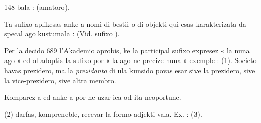 \begin{VUpage}[152]{148}
\VUcontinue
bala :  (amatoro), \nl
{}\nl
{}\nl
{}\nl
{}

Ta sufixo aplikesas anke a nomi di bestii o di objekti qui\nl
esas karakterizata da specal ago kustumala : \cc
{} (Vid.\nl
sufixo ).

Per la decido 689 l'Akademio aprobis, ke la participal\nl
sufixo  expresez « la nuna ago » ed ol adoptis la sufixo\nl
{} por « la ago ne precize nuna » exemple :  (1).\nl
Societo havas prezidero, ma la \textit{prezidanto} di ula kunsido\nl
povas esar sive la prezidero, sive la vice-prezidero, sive altra\nl
membro.

Komparez  a  ed anke a  por ne uzar ica od\nl
ita neoportune.

 (2) darfas, kompreneble, recevar la formo adjekti\cc
vala. Ex. : \nl
{}\nl
{} (3).
\end{VUpage}

